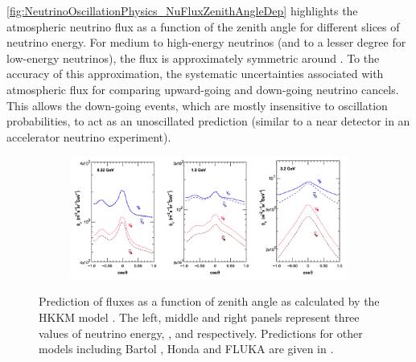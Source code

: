 \autoref{fig:NeutrinoOscillationPhysics_NuFluxZenithAngleDep} highlights the atmospheric neutrino flux as a function of the zenith angle for different slices of neutrino energy. For medium to high-energy neutrinos (and to a lesser degree for low-energy neutrinos), the flux is approximately symmetric around . To the accuracy of this approximation, the systematic uncertainties associated with atmospheric flux for comparing upward-going and down-going neutrino cancels. This allows the down-going events, which are mostly insensitive to oscillation probabilities, to act as an unoscillated prediction (similar to a near detector in an accelerator neutrino experiment).

\begin{figure}[h]
  \begin{subfigure}[t]{0.90\textwidth}
    \includegraphics[width=\textwidth, trim={0mm 0mm 0mm 0mm}, clip,page=1]{Figures/Theory/NuFluxZenithAngleDep.pdf}
  \end{subfigure}
  \caption{Prediction of  fluxes as a function of zenith angle as calculated by the HKKM model \cite{Honda:2011}. The left, middle and right panels represent three values of neutrino energy, ,  and  respectively. Predictions for other models including Bartol \cite{Barr_2004}, Honda \cite{Honda_2007} and FLUKA \cite{etde_20239111} are given in \cite{Ashie_2005}.}
  \label{fig:NeutrinoOscillationPhysics_NuFluxZenithAngleDep}
\end{figure}

